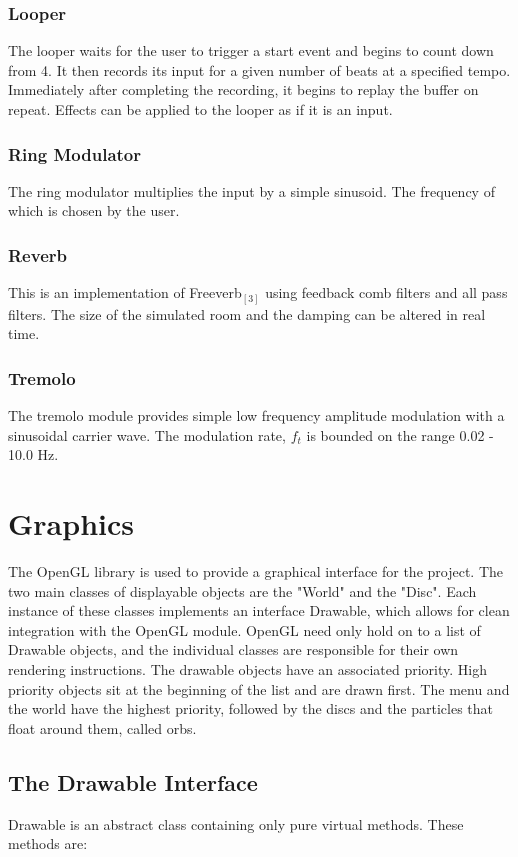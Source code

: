 \documentclass[pdftext,twoside,10pt]{article}
\begin{document}
\subsubsection*{Looper}
The looper waits for the user to trigger a start event and begins to count down from 4. It then records its input for a given number of beats at a specified tempo. Immediately after completing the recording, it begins to replay the buffer on repeat. Effects can be applied to the looper as if it is an input. 

\subsubsection*{Ring Modulator}
The ring modulator multiplies the input by a simple sinusoid. The frequency of which is chosen by the user.

\subsubsection*{Reverb}
This is an implementation of Freeverb$_{[3]}$ using feedback comb filters and all pass filters. The size of the simulated room and the damping can be altered in real time.

\subsubsection*{Tremolo} 
The tremolo module provides simple low frequency amplitude modulation with a sinusoidal carrier wave. The modulation rate, $f_t$ is bounded on the range 0.02 - 10.0 Hz.

\section{Graphics}
The OpenGL library is used to provide a graphical interface for the project. The two main classes of displayable objects are the "World" and the "Disc". Each instance of these classes implements an interface Drawable, which allows for clean integration with the OpenGL module. OpenGL need only hold on to a list of Drawable objects, and the individual classes are responsible for their own rendering instructions. The drawable objects have an associated priority. High priority objects sit at the beginning of the list and are drawn first. The menu and the world have the highest priority, followed by the discs and the particles that float around them, called orbs.

\subsection{The Drawable Interface}
Drawable is an abstract class containing only pure virtual methods. These methods are:
\end{document}
